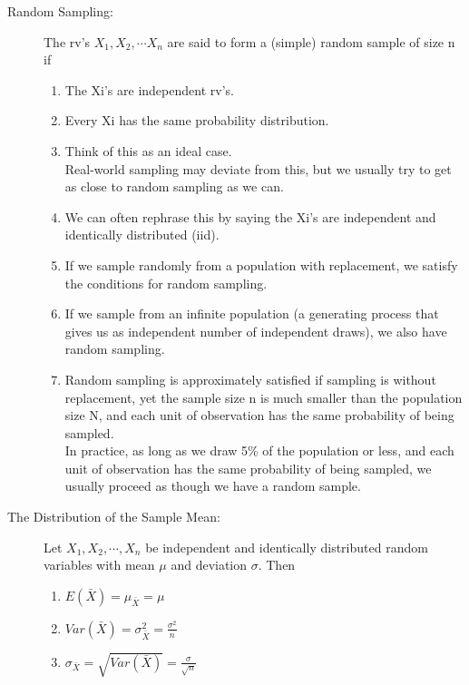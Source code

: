 \documentclass[10pt,landscape]{article}
\begin{document}
\begin{multicols}{3}
\begin{description}
\item[Random Sampling:] The rv's $X_1, X_2, \cdots X_n$ are said to form a (simple) random sample of size n if
\begin{enumerate}
  \item The Xi's are independent rv's.
  \item Every Xi has the same probability distribution.
  \item Think of this as an ideal case.\\
      Real-world sampling may deviate from this, but we usually try to get as close to random sampling as we can.
  \item We can often rephrase this by saying the Xi's are independent and identically distributed (iid).
  \item If we sample randomly from a population with replacement, we satisfy the conditions for random sampling.
  \item  If we sample from an infinite population (a generating process that gives us as independent number of independent draws), we also have random sampling.
  \item Random sampling is approximately satisfied if sampling is without replacement, yet the sample size n is much smaller than the population size N, and each unit of observation has the same probability of being sampled. \\
  In practice, as long as we draw 5\% of the population or less, and each unit of observation has the same probability of being sampled, we usually proceed as though we have a random sample.
\end{enumerate}
\item[The Distribution of the Sample Mean: ] Let $X_1, X_2, \cdots, X_n$ be independent and identically distributed random variables with mean $\mu$ and deviation $\sigma$. Then
\begin{enumerate}
  \item $E(\bar{X})=\mu_{\bar{X}}=\mu$
  \item $Var(\bar{X})=\sigma_{\bar{X}}^2=\frac{\sigma^2}{n}$
  \item $\sigma_{\bar{X}} = \sqrt{Var(\bar{X})} = \frac{\sigma}{\sqrt{n}}$
\end{enumerate}


\end{description}
\end{multicols}
\end{document}
